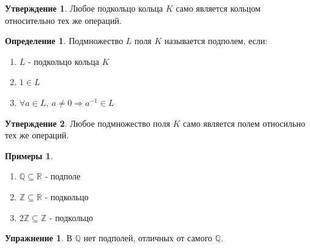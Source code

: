 \documentclass[a4paper, 12pt]{article}
\newcommand{\R}{\mathbb R}
\newcommand{\Q}{\mathbb Q}
\newcommand{\Z}{\mathbb Z}
\newcommand\tab[1][.5cm]{\hspace*{#1}}
\theoremstyle{definition}
\newtheorem*{definition}{Определение}
\newtheorem*{subtheorem}{Утверждение}
\newtheorem*{example}{Примеры}
\newtheorem*{Exercise}{Упражнение}
\begin{document}
  \begin{subtheorem}
    Любое подкольцо кольца $K$ само является кольцом относительно тех же операций.  
  \end{subtheorem}
  \begin{definition}
    Подмножество $L$ поля $K$ называется подполем, если:
    \begin{enumerate}
      \item $L$ - подкольцо кольца $K$
      \item $1 \in L$
      \item $\forall a \in L, \ a \neq 0 \Longrightarrow a^{-1} \in L$   
    \end{enumerate}
  \end{definition}
  \begin{subtheorem}
    Любое подмножество поля $K$ само является полем относильно тех же операций.  
  \end{subtheorem}  
  \begin{example} \tab
    \begin{enumerate}
      \item $\Q \subseteq \R$ - подполе
      \item $\Z \subseteq \R$ - подкольцо
      \item $2\Z \subseteq \Z$ - подкольцо
    \end{enumerate}
  \end{example} 
  \begin{Exercise}
    В $\Q$ нет подполей, отличных от самого $\Q$.
  \end{Exercise}
\end{document}
